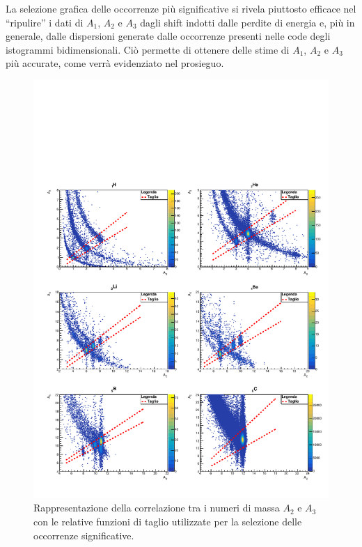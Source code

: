 \documentclass[12pt,a4paper,twoside]{report}
\begin{document}
	La selezione grafica delle occorrenze più significative si rivela piuttosto efficace nel ``ripulire'' i dati di $A_1$, $A_2$ e $A_3$ dagli shift indotti dalle perdite di energia e, più in generale, dalle dispersioni generate dalle occorrenze presenti nelle code degli istogrammi bidimensionali. Ciò permette di ottenere delle stime di $A_1$, $A_2$ e $A_3$ più accurate, come verrà evidenziato nel prosieguo.
	\begin{figure}[H]
		\centering
		\includegraphics[width=1.\linewidth]{c_MultiCanvasCut3.pdf}
		\caption{Rappresentazione della correlazione tra i numeri di massa $A_2$ e $A_3$ con le relative funzioni di taglio utilizzate per la selezione delle occorrenze significative.}
		\label{fig:a3_cut}
	\end{figure}
	
\end{document}
